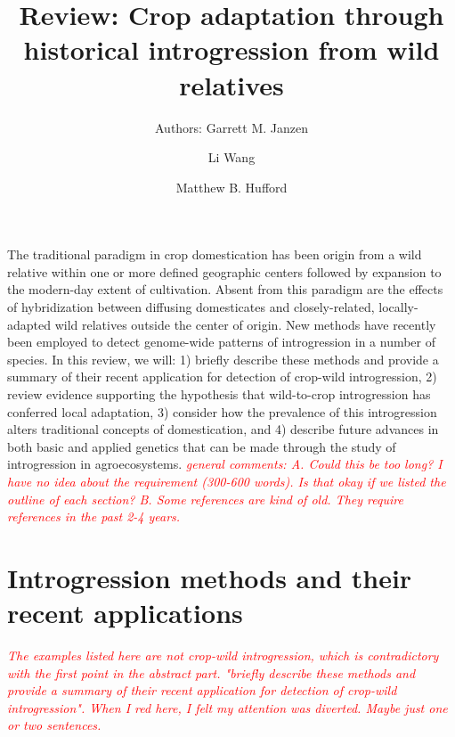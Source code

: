 \documentclass[11pt]{article}
\title{Review: Crop adaptation through historical introgression from wild relatives}
\author[1]{Authors: Garrett M. Janzen}%
\author[1]{Li Wang}
\author[1,*]{Matthew B. Hufford}
\affil[1]{Department of Ecology, Evolution, and Organismal Biology, Iowa State University, Ames, Iowa, USA}
\affil[*]{Correspondence: mhufford@iastate.edu (M.B. Hufford)}
\date{}
\newcommand{\lwang}[1]{\textcolor{red}{ \emph{\scriptsize  #1}} } %
\begin{document}
\maketitle

The traditional paradigm in crop domestication has been origin from a wild relative within one or more defined geographic centers followed by expansion to the modern-day extent of cultivation.
Absent from this paradigm are the effects of hybridization between diffusing domesticates and closely-related, locally-adapted wild relatives outside the center of origin.
New methods have recently been employed to detect genome-wide patterns of introgression in a number of species.
In this review, we will: 1) briefly describe these methods and provide a summary of their recent application for detection of crop-wild introgression, 2) review evidence supporting the hypothesis that wild-to-crop introgression has conferred local adaptation, 3) consider how the prevalence of this introgression alters traditional concepts of domestication, and 4) describe future advances in both basic and applied genetics that can be made through the study of introgression in agroecosystems.
\lwang{general comments: A. Could this be too long? I have no idea about the requirement (300-600 words). Is that okay if we listed the outline of each section? B. Some references are kind of old. They require references in the past 2-4 years. }

\section*{Introgression methods and their recent applications}
\lwang{The examples listed here are not crop-wild introgression, which is contradictory with the first point in the abstract part. "briefly describe these methods and provide a summary of their recent application for detection of crop-wild introgression". When I red here, I felt my attention was diverted. Maybe just one or two sentences.}
\end{document}
